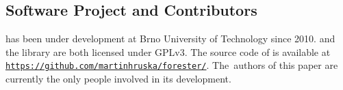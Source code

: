 \subsection{Software Project and Contributors}\label{sec:project_contributors}

\forester{} has been under development at Brno University of Technology since 2010.
\forester{} and the \vata{} library are both licensed under GPLv3.
The source code of \forester{} is available at {\footnotesize\href{https://github.com/martinhruska/forester/}
{\texttt{https://github.com/martinhruska/forester/}}}.
The~authors of this paper are currently the only people involved in its
development.
